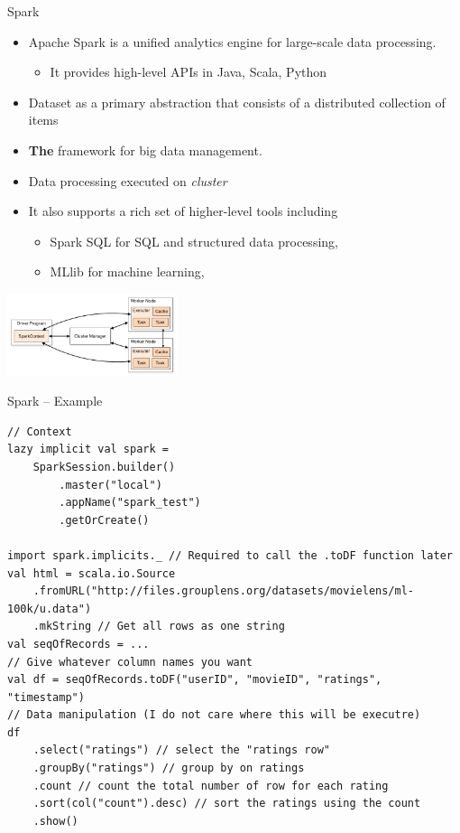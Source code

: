 \documentclass[presentation, 9pt]{beamer}\mode<presentation>{\usetheme{AMSBolognaFC}}
\begin{document}
\begin{frame}{Spark \href{https://spark.apache.org/}{\faLink}}
	\begin{itemize}
		\item Apache Spark is a unified analytics engine for large-scale data processing.
		\begin{itemize}
			\item It provides high-level APIs in Java, Scala, Python
		\end{itemize}
		\item Dataset as a primary abstraction that consists of a distributed collection of items 
  	\item \textbf{The} framework for big data management.
   \item Data processing executed on \emph{cluster}
   	\item It also supports a rich set of higher-level tools including 
		 \begin{itemize}
			\item Spark SQL for SQL and structured data processing, 
   		\item MLlib for machine learning,  
		 \end{itemize}
	\end{itemize}
	\centering
	\includegraphics[width=5cm]{img/cluster-overview.png}
\end{frame}
\begin{frame}[fragile]{Spark -- Example \href{https://github.com/cric96/spark-mini-example}{\faLink}}
	\begin{alertblock}{}
		\begin{tcolorbox}[left=0pt, top=0pt, bottom=0pt]
			\begin{verbatim}
// Context
lazy implicit val spark =
	SparkSession.builder()
		.master("local")
		.appName("spark_test")
		.getOrCreate()

import spark.implicits._ // Required to call the .toDF function later
val html = scala.io.Source
	.fromURL("http://files.grouplens.org/datasets/movielens/ml-100k/u.data")
	.mkString // Get all rows as one string
val seqOfRecords = ...
// Give whatever column names you want
val df = seqOfRecords.toDF("userID", "movieID", "ratings", "timestamp")
// Data manipulation (I do not care where this will be executre)
df
	.select("ratings") // select the "ratings row"
	.groupBy("ratings") // group by on ratings
	.count // count the total number of row for each rating
	.sort(col("count").desc) // sort the ratings using the count
	.show()
			\end{verbatim}
		\end{tcolorbox}
	\end{alertblock}
\end{frame}
\end{document}

